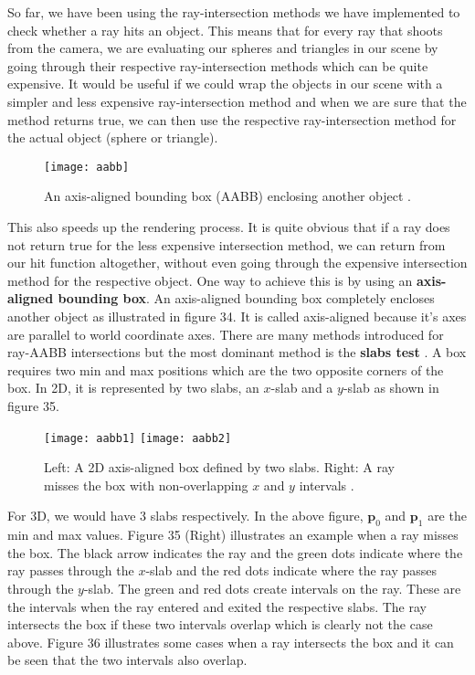 \documentclass[11pt,a4paper]{article}
\begin{document}
	So far, we have been using the ray-intersection methods we have implemented to check whether a ray hits an object. This means that for every ray that shoots from the camera, we are evaluating our spheres and triangles in our scene by going through their respective ray-intersection methods which can be quite expensive. It would be useful if we could wrap the objects in our scene with a simpler and less expensive ray-intersection method and when we are sure that the method returns true, we can then use the respective ray-intersection method for the actual object (sphere or triangle).
	\begin{figure}[H]
		\centering
		\captionsetup{justification=centering}
		\texttt{[image: aabb]}\quad
		\caption{An axis-aligned bounding box (AABB) enclosing another object \protect\cite{ericson2004real}.}
	\end{figure}
	\noindent
	This also speeds up the rendering process. It is quite obvious that if a ray does not return true for the less expensive intersection method, we can return from our hit function altogether, without even going through the expensive intersection method for the respective object. One way to achieve this is by using an \textbf{axis-aligned bounding box}. An axis-aligned bounding box completely encloses another object as illustrated in figure 34. It is called axis-aligned because it's axes are parallel to world coordinate axes. There are many methods introduced for ray-AABB intersections but the most dominant method is the \textbf{slabs test} \cite{kay1986ray}.
	\noindent
	A box requires two min and max positions which are the two opposite corners of the box. In 2D, it is represented by two slabs, an $x$-slab and a $y$-slab as shown in figure 35.
	\begin{figure}[H]
		\centering
		\captionsetup{justification=centering}
		\texttt{[image: aabb1]}\quad
		\texttt{[image: aabb2]}\quad
		\caption{Left: A 2D axis-aligned box defined by two slabs. Right: A ray misses the box with non-overlapping $x$ and $y$ intervals \protect\cite{suffern2016ray}.}
	\end{figure}
	\noindent
	For 3D, we would have 3 slabs respectively. In the above figure, $\boldsymbol{p}_{0}$ and $\boldsymbol{p}_{1}$ are the min and max values. Figure 35 (Right) illustrates an example when a ray misses the box. The black arrow indicates the ray and the green dots indicate where the ray passes through the $x$-slab and the red dots indicate where the ray passes through the $y$-slab. The green and red dots create intervals on the ray. These are the intervals when the ray entered and exited the respective slabs. The ray intersects the box if these two intervals overlap which is clearly not the case above. Figure 36 illustrates some cases when a ray intersects the box and it can be seen that the two intervals also overlap.
\end{document}
